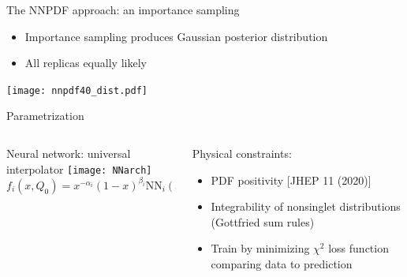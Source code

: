 \begin{frame}[t]{The NNPDF approach: an importance sampling}
  \begin{itemize}
    \item Importance sampling produces Gaussian posterior distribution
    \item All replicas equally likely
  \end{itemize}
  \begin{center}
    \texttt{[image: nnpdf40\_dist.pdf]}
  \end{center}
\end{frame}



\begin{frame}[t]{Parametrization}
  \begin{columns}[T]
      \begin{column}{0.48\textwidth}
        Neural network: universal interpolator
        \vspace*{0.3cm}
        \texttt{[image: NNarch]}
        \begin{equation*}
            f_{i}\left(x, Q_{0}\right)=x^{-\alpha_{i}}(1-x)^{\beta_{i}} \mathrm{NN}_{i}(x)
        \end{equation*}
      \end{column}
      \begin{column}{0.48\textwidth}
        Physical constraints:
        \begin{itemize}
            \item PDF positivity [JHEP 11 (2020)]
            \item Integrability of nonsinglet distributions (Gottfried sum rules)
        \end{itemize}
        \vspace*{0.3cm}
        \begin{itemize}
          \item Train by minimizing $\chi^2$ loss function comparing data to prediction\\
        \end{itemize}
      \end{column}
  \end{columns}
\end{frame}


